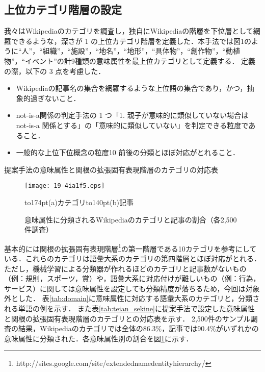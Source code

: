 \documentclass[japanese]{jnlp_1.4}
\begin{document}
\subsection{上位カテゴリ階層の設定}
\label{sec:imizokusei_settei}

我々はWikipediaのカテゴリを調査し，独自にWikipediaの階層を下位層として網羅できるような，深さが 1 の上位カテゴリ階層を定義した．本手法では図1のように``人''，``組織''，\mbox{``施}設''，``地名''，``地形''，``具体物''，``創作物''，``動植物''，``イベント''の計9種類の意味属性を最上位カテゴリとして定義する．
定義の際，以下の 3 点を考慮した．

\begin{itemize}
\item[1.]
Wikipediaの記事名の集合を網羅するような上位語の集合であり，かつ，抽象的過ぎないこと．
\item[2.]
not-is-a関係の判定手法の 1 つ「1. 親子が意味的に類似していない場合はnot-is-a 関係とする」の「意味的に類似していない」を判定できる粒度であること．
\item[3.]
一般的な上位下位概念の粒度10 前後の分類とほぼ対応がとれること．
\end{itemize}

\begin{table}[b]
\caption{提案手法の意味属性と関根の拡張固有表現階層のカテゴリの対応表}
\label{tab:teian_sekine}

\end{table}
\begin{figure}[b]
\begin{center}
\texttt{[image: 19-4ia1f5.eps]}
\end{center}
\hfil\small\hbox to174pt{\hfil(a)カテゴリ\hfil}\hspace{56pt}\hbox to140pt{\hfil(b)記事\hfil}\hfil
\caption{意味属性に分類されるWikipediaのカテゴリと記事の割合（各2,500件調査）}
\label{fig:rate}
\end{figure}

\noindent
基本的には関根の拡張固有表現階層\footnote{http://sites.google.com/site/extendednamedentityhierarchy/}の第一階層である10カテゴリを参考にしている．これらのカテゴリは語彙大系のカテゴリの第四階層とほぼ対応がとれる．
ただし，機械学習による分類器が作れるほどのカテゴリと記事数がないもの（例：規則，スポーツ，賞）や，語彙大系に対応付けが難しいもの（例：行為，サービス）に関しては意味属性を設定しても分類精度が落ちるため，今回は対象外とした．
表\ref{tab:domain}に意味属性に対応する語彙大系のカテゴリと，分類される単語の例を示す．
また表\ref{tab:teian_sekine}に提案手法で設定した意味属性と関根の拡張固有表現階層のカテゴリとの対応表を示す．
2,500件のサンプル調査の結果，Wikipediaのカテゴリでは全体の86.3\%，記事では90.4\%がいずれかの意味属性に分類された．各意味属性別の割合を図\ref{fig:rate}に示す．
\end{document}
